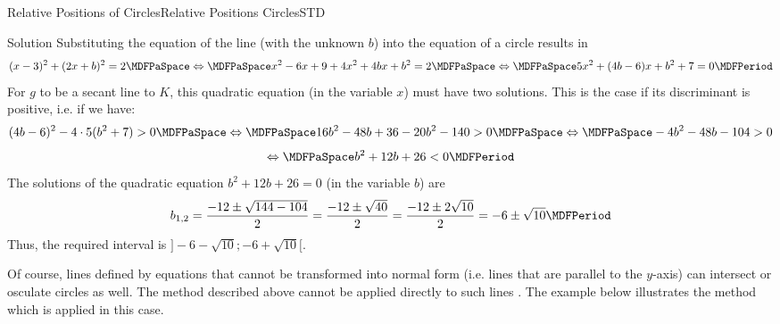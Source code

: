 \begin{MXContent}{Relative Positions of Circles}{Relative Positions Circles}{STD}
\begin{MExercise}

\begin{MHint}{Solution}
Substituting the equation of the line (with the unknown $b$) into the equation of a circle results in
\[
 (x-3)^2+(2x+b)^2=2\MDFPaSpace\Leftrightarrow\MDFPaSpace x^2-6x+9+4x^2+4b x+b^2=2\MDFPaSpace\Leftrightarrow\MDFPaSpace 5x^2+(4b-6)x+b^2+7=0 \MDFPeriod
\]
For $g$ to be a secant line to $K$, this quadratic equation (in the variable $x$) must have two solutions. This is the case 
if its discriminant is positive, i.e. if we have:
\[
 (4b-6)^2-4\cdot 5(b^2+7)>0\MDFPaSpace\Leftrightarrow\MDFPaSpace 16b^2-48b+36-20b^2-140>0\MDFPaSpace\Leftrightarrow\MDFPaSpace -4b^2-48b-104>0
\]
\[
 \Leftrightarrow\MDFPaSpace b^2+12b+26<0\MDFPeriod
\]
The solutions of the quadratic equation $b^2+12b+26=0$ (in the variable $b$) are
\[
 b_{1,2}=\frac{-12\pm\sqrt{144-104}}{2}=\frac{-12\pm\sqrt{40}}{2}=\frac{-12\pm2\sqrt{10}}{2}=-6\pm\sqrt{10} \MDFPeriod
\]
Thus, the required interval is $]-6-\sqrt{10};-6+\sqrt{10}[$.
\end{MHint}
\end{MExercise}

Of course, lines defined by equations that cannot be transformed into normal form (i.e. lines that are parallel 
to the $y$-axis) can intersect or osculate circles as well. The method described above cannot be 
applied directly to such lines . The example below illustrates the method which is applied in this case.


\end{MXContent}

